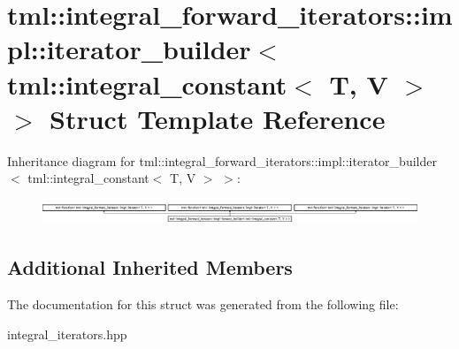\hypertarget{structtml_1_1integral__forward__iterators_1_1impl_1_1iterator__builder_3_01tml_1_1integral__constant_3_01T_00_01V_01_4_01_4}{\section{tml\+:\+:integral\+\_\+forward\+\_\+iterators\+:\+:impl\+:\+:iterator\+\_\+builder$<$ tml\+:\+:integral\+\_\+constant$<$ T, V $>$ $>$ Struct Template Reference}
\label{structtml_1_1integral__forward__iterators_1_1impl_1_1iterator__builder_3_01tml_1_1integral__constant_3_01T_00_01V_01_4_01_4}
}
Inheritance diagram for tml\+:\+:integral\+\_\+forward\+\_\+iterators\+:\+:impl\+:\+:iterator\+\_\+builder$<$ tml\+:\+:integral\+\_\+constant$<$ T, V $>$ $>$\+:\begin{figure}[H]
\begin{center}
\leavevmode
\includegraphics[height=0.751174cm]{structtml_1_1integral__forward__iterators_1_1impl_1_1iterator__builder_3_01tml_1_1integral__constant_3_01T_00_01V_01_4_01_4}
\end{center}
\end{figure}
\subsection*{Additional Inherited Members}


The documentation for this struct was generated from the following file\+:\begin{DoxyCompactItemize}
\item 
integral\+\_\+iterators.\+hpp\end{DoxyCompactItemize}

